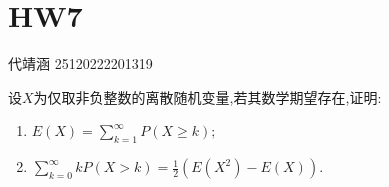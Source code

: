 \documentclass[../main.tex]{subfiles}
\begin{document}
\ifSubfilesClassLoaded{

    
    \setcounter{chapter}{6}
}{}

\chapter{ HW7 }
 代靖涵 25120222201319

 \begin{exercise}{}{}
    设$X$为仅取非负整数的离散随机变量,若其数学期望存在,证明:
\begin{enumerate}
\item $E(X) = \sum_{k=1}^{\infty} P(X \geq k);$
\item $\sum_{k=0}^{\infty} kP(X > k) = \frac{1}{2}(E(X^2) - E(X)).$
\end{enumerate}
 \end{exercise}
\end{document}
